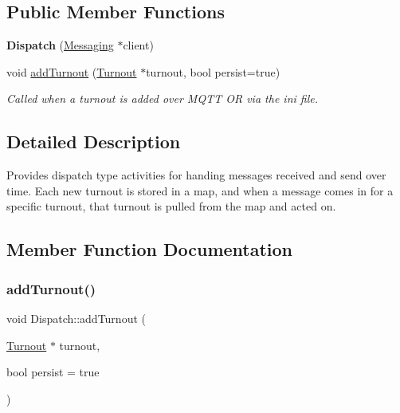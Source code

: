 \subsection*{Public Member Functions}
\begin{DoxyCompactItemize}
\item 
\mbox{\label{classDispatch_aad7b6c1bd066e905cf3340061eed3edb}} 
{\bfseries Dispatch} (\hyperlink{classMessaging}{Messaging} $\ast$client)
\item 
void \hyperlink{classDispatch_aec3da26ad4b3550ce4d47fe5c5ed2f27}{add\+Turnout} (\hyperlink{classTurnout}{Turnout} $\ast$turnout, bool persist=true)
\begin{DoxyCompactList}\small\item\em Called when a turnout is added over M\+Q\+TT OR via the ini file. \end{DoxyCompactList}\end{DoxyCompactItemize}


\subsection{Detailed Description}
Provides dispatch type activities for handing messages received and send over time. Each new turnout is stored in a map, and when a message comes in for a specific turnout, that turnout is pulled from the map and acted on. 

\subsection{Member Function Documentation}
\mbox{\label{classDispatch_aec3da26ad4b3550ce4d47fe5c5ed2f27}} 
\subsubsection{\texorpdfstring{add\+Turnout()}{addTurnout()}}
{\footnotesize\ttfamily void Dispatch\+::add\+Turnout (\begin{DoxyParamCaption}\item[{\hyperlink{classTurnout}{Turnout} $\ast$}]{turnout,  }\item[{bool}]{persist = {\ttfamily true} }\end{DoxyParamCaption})}



